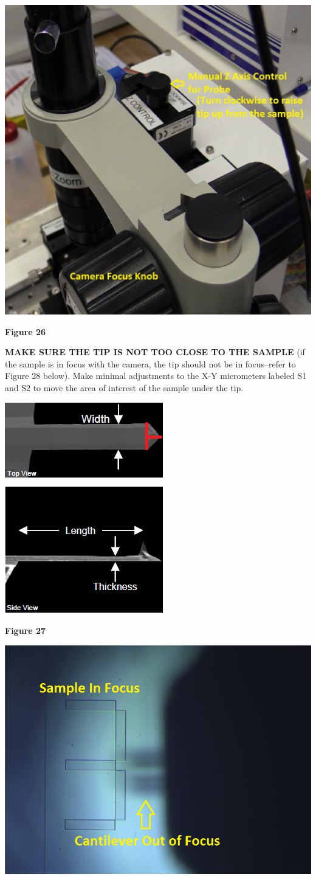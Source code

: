 \documentclass{../lab}
\begin{document}
\begin{center}
    \href{http://experimentationlab.berkeley.edu/sites/default/files/AFMImages/ZControl.jpg}{\includegraphics[width=0.5\linewidth]{images/ZControl.jpg}}
\end{center}


\textbf{Figure 26}

\textbf{MAKE SURE THE TIP IS NOT TOO CLOSE TO THE SAMPLE} (if the sample is in focus with the camera, the tip should not be in focus--refer to Figure 28 below).  Make minimal adjustments to the X-Y micrometers labeled S1 and S2 to move the area of interest of the sample under the tip.


\begin{center}
    \href{http://experimentationlab.berkeley.edu/sites/default/files/AFMImages/26.png}{\includegraphics[width=0.5\linewidth]{images/26.png}}
\end{center}


\textbf{Figure 27}

\begin{center}
    \href{http://experimentationlab.berkeley.edu/sites/default/files/AFMImages/probe_unfocused1_0.png}{\includegraphics[width=0.5\linewidth]{images/probe_unfocused1_0.png}}
\end{center}
\end{document}
